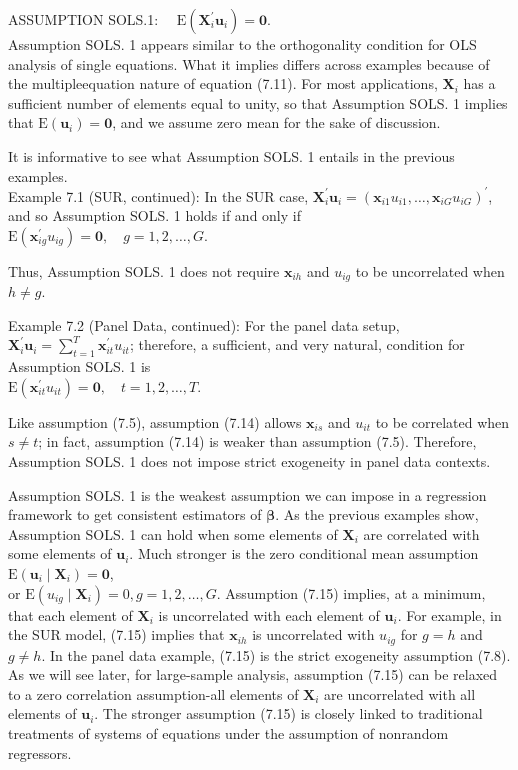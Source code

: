 \documentclass[10pt]{article}
\begin{document}
ASSUMPTION SOLS.1: $\quad \mathrm{E}\left(\mathbf{X}_{i}^{\prime} \mathbf{u}_{i}\right)=\mathbf{0}$.\\
Assumption SOLS. 1 appears similar to the orthogonality condition for OLS analysis of single equations. What it implies differs across examples because of the multipleequation nature of equation (7.11). For most applications, $\mathbf{X}_{i}$ has a sufficient number of elements equal to unity, so that Assumption SOLS. 1 implies that $\mathrm{E}\left(\mathbf{u}_{i}\right)=\mathbf{0}$, and we assume zero mean for the sake of discussion.

It is informative to see what Assumption SOLS. 1 entails in the previous examples.\\
Example 7.1 (SUR, continued): In the SUR case, $\mathbf{X}_{i}^{\prime} \mathbf{u}_{i}=\left(\mathbf{x}_{i 1} u_{i 1}, \ldots, \mathbf{x}_{i G} u_{i G}\right)^{\prime}$, and so Assumption SOLS. 1 holds if and only if\\
$\mathrm{E}\left(\mathbf{x}_{i g}^{\prime} u_{i g}\right)=\mathbf{0}, \quad g=1,2, \ldots, G$.

Thus, Assumption SOLS. 1 does not require $\mathbf{x}_{i h}$ and $u_{i g}$ to be uncorrelated when $h \neq g$.

Example 7.2 (Panel Data, continued): For the panel data setup, $\mathbf{X}_{i}^{\prime} \mathbf{u}_{i}=\sum_{t=1}^{T} \mathbf{x}_{i t}^{\prime} u_{i t}$; therefore, a sufficient, and very natural, condition for Assumption SOLS. 1 is\\
$\mathrm{E}\left(\mathbf{x}_{i t}^{\prime} u_{i t}\right)=\mathbf{0}, \quad t=1,2, \ldots, T$.

Like assumption (7.5), assumption (7.14) allows $\mathbf{x}_{i s}$ and $u_{i t}$ to be correlated when $s \neq t$; in fact, assumption (7.14) is weaker than assumption (7.5). Therefore, Assumption SOLS. 1 does not impose strict exogeneity in panel data contexts.

Assumption SOLS. 1 is the weakest assumption we can impose in a regression framework to get consistent estimators of $\boldsymbol{\beta}$. As the previous examples show, Assumption SOLS. 1 can hold when some elements of $\mathbf{X}_{i}$ are correlated with some elements of $\mathbf{u}_{i}$. Much stronger is the zero conditional mean assumption\\
$\mathrm{E}\left(\mathbf{u}_{i} \mid \mathbf{X}_{i}\right)=\mathbf{0}$,\\
or $\mathrm{E}\left(u_{i g} \mid \mathbf{X}_{i}\right)=0, g=1,2, \ldots, G$. Assumption (7.15) implies, at a minimum, that each element of $\mathbf{X}_{i}$ is uncorrelated with each element of $\mathbf{u}_{i}$. For example, in the SUR model, (7.15) implies that $\mathbf{x}_{i h}$ is uncorrelated with $u_{i g}$ for $g=h$ and $g \neq h$. In the panel data example, (7.15) is the strict exogeneity assumption (7.8). As we will see later, for large-sample analysis, assumption (7.15) can be relaxed to a zero correlation assumption-all elements of $\mathbf{X}_{i}$ are uncorrelated with all elements of $\mathbf{u}_{i}$. The stronger assumption (7.15) is closely linked to traditional treatments of systems of equations under the assumption of nonrandom regressors.
\end{document}
